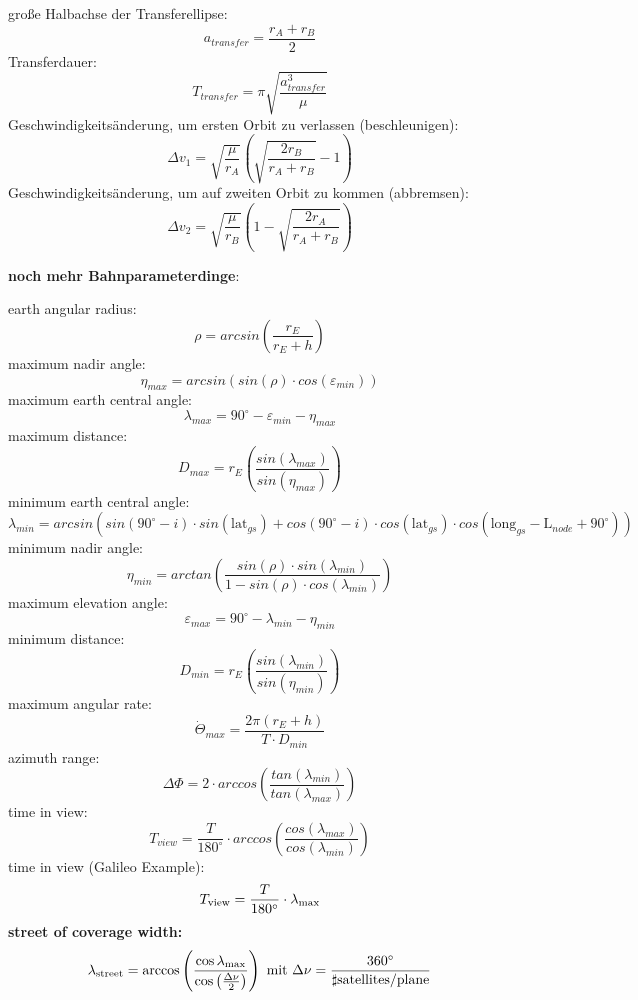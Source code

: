 \documentclass[a4paper,10pt]{article}
\newcommand{\f}{\textbf}
\begin{document}
\noindent große Halbachse der Transferellipse:
\[a_{transfer} = \frac{r_A + r_B}{2}\]
Transferdauer: 
\[T_{transfer} = \pi \sqrt{\frac{a_{transfer}^3}{\mu}}\]
Geschwindigkeitsänderung, um ersten Orbit zu verlassen (beschleunigen): 
\[\Delta v_1 = \sqrt{\frac{\mu}{r_A}}\left(\sqrt{\frac{2r_B}{r_A + r_B}} -1 \right)\]
Geschwindigkeitsänderung, um auf zweiten Orbit zu kommen (abbremsen): 
\[\Delta v_2 = \sqrt{\frac{\mu}{r_B}}\left(1-\sqrt{\frac{2r_A}{r_A + r_B}} \right)\]
\vspace*{5pt}

\noindent \f{noch mehr Bahnparameterdinge}:
\vspace*{5pt}

\noindent earth angular radius:
\[\rho = arcsin\left(\frac{r_E}{r_E + h}\right)\]
maximum nadir angle:
\[\eta_{max} = arcsin(sin(\rho)\cdot cos(\varepsilon_{min})) \]
maximum earth central angle:
\[\lambda_{max} = 90^{\circ} - \varepsilon_{min} - \eta_{max}\]
maximum distance:
\[D_{max} = r_E\left(\frac{sin(\lambda_{max})}{sin(\eta_{max})} \right)\]
minimum earth central angle:
\[\lambda_{min} = arcsin(sin(90^{\circ}-i)\cdot sin(\text{lat}_{gs}) + cos(90^{\circ}-i)\cdot cos(\text{lat}_{gs})\cdot cos(\text{long}_{gs}-\text{L}_{node}+90^{\circ}))\]
minimum nadir angle:
\[\eta_{min} = arctan\left(\frac{sin(\rho)\cdot sin(\lambda_{min})}{1-sin(\rho)\cdot cos(\lambda_{min})}\right)\]
maximum elevation angle:
\[\varepsilon_{max} = 90^{\circ} -\lambda_{min} - \eta_{min}\]
minimum distance:
\[D_{min} = r_E\left(\frac{sin(\lambda_{min})}{sin(\eta_{min})}\right)\]
maximum angular rate:
\[\dot{\Theta}_{max} = \frac{2\pi(r_E + h)}{T\cdot D_{min}}\]
azimuth range:
\[\Delta \Phi = 2\cdot arccos\left(\frac{tan(\lambda_{min})}{tan(\lambda_{max})}\right)\]
time in view:
\[T_{view} = \frac{T}{180^{\circ}}\cdot arccos\left(\frac{cos(\lambda_{max})}{cos(\lambda_{min})}\right)\]
time in view (Galileo Example):
\[T_\text{view} = \frac{T}{180\degree}\cdot \lambda_\text{max}\]
\f{street of coverage width:}
\[ \lambda_\text{street} = \arccos\left( \frac{\cos \lambda_\text{max}}{\cos\left( \frac{\Delta\nu}{2} \right)} \right) \text{   mit   } \Delta\nu = \frac{360\degree}{\sharp\text{satellites/plane}}\]
\end{document}
